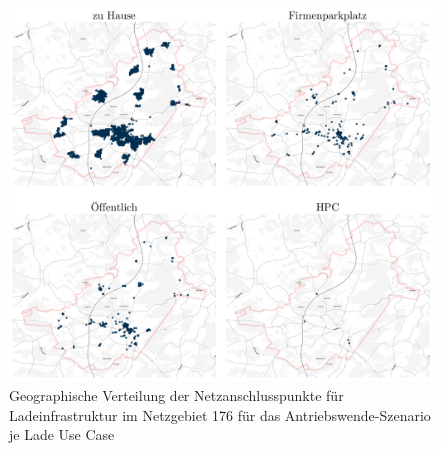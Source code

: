 \begin{figure}[H]
    \centering
    \includegraphics[width=\textwidth]{Bilder/cps_in_grid_176}
    \caption{Geographische Verteilung der Netzanschlusspunkte für Ladeinfrastruktur im Netzgebiet \num{176} für das Antriebswende-Szenario je Lade Use Case}\label{fig:cps_in_grid}
\end{figure}